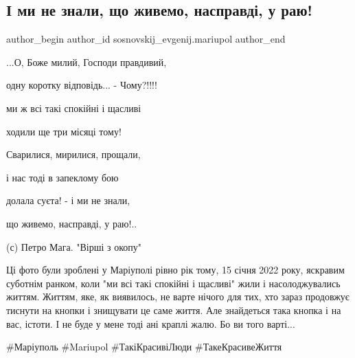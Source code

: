  
 
 
 
 

\subsection{І ми не знали, що живемо, насправді, у раю!}
\label{sec:15_01_2023.fb.sosnovskij_evgenij.mariupol.1.__mi_ne_znali__shcho}

\ifcmt
 author_begin
   author_id sosnovskij_evgenij.mariupol
 author_end
\fi

...О, Боже милий, Господи правдивий,

одну коротку відповідь... - Чому?!!!!

ми ж всі такі спокійні і щасливі

ходили ще три місяці тому!

Сварилися, мирилися, прощали,

і нас тоді в запеклому бою

долала суєта! - і ми не знали,

що живемо, насправді, у раю!..

(с) Петро Мага. "Вірші з окопу"

Ці фото були зроблені у Маріуполі рівно рік тому, 15 січня 2022 року, яскравим
суботнім ранком, коли "ми всі такі спокійні і щасливі" жили і насолоджувались
життям. Життям, яке, як виявилось, не варте нічого для тих, хто зараз продовжує
тиснути на кнопки і знищувати це саме життя. Але знайдеться така кнопка і на
вас, істоти. І не буде у мене тоді ані краплі жалю. Бо ви того варті...

\#Маріуполь \#Mariupol \#ТакіКрасивіЛюди \#ТакеКрасивеЖиття
